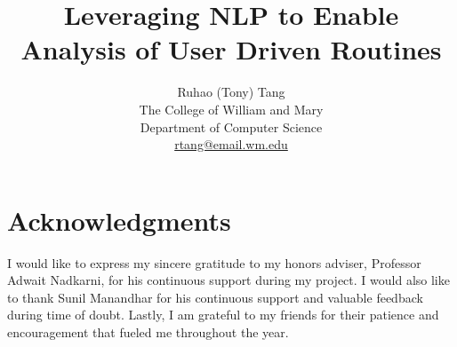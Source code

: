 \documentclass[10pt,twocolumn,pdftex]{article}
\title{Leveraging NLP to Enable Analysis of User Driven Routines}
\author{
    {\rm Ruhao (Tony) Tang}\\
    The College of William and Mary\\
    {\rm Department of Computer Science}\\
    {\rm \url{rtang@email.wm.edu}}
}
\begin{document}

\maketitle






%









\section*{Acknowledgments}
I would like to express my sincere gratitude to my honors adviser, Professor Adwait Nadkarni, for his continuous support during my project. I would also like to thank Sunil Manandhar for his continuous support and valuable feedback during time of doubt. Lastly, I am grateful to my friends for their patience and encouragement that fueled me throughout the year.








\end{document}
